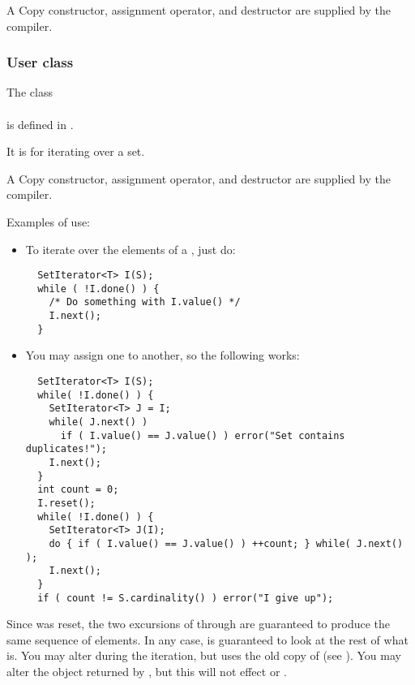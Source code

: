 \noindent A Copy constructor, assignment operator,
and destructor are supplied by the compiler.


\subsubsection{User class }\label{setiterator}


\noindent The class\\
\\
is defined in .

It is for iterating over a set.



\noindent A Copy constructor, assignment operator,
and destructor are supplied by the compiler.

\noindent Examples of use:

\begin{itemize}
\item
To iterate over the elements of a , just do:

\begin{verbatim}
  SetIterator<T> I(S);
  while ( !I.done() ) {
    /* Do something with I.value() */
    I.next();
  }
\end{verbatim}

\item
You may assign one  to another, so the following works:

\begin{verbatim}
  SetIterator<T> I(S);
  while( !I.done() ) {
    SetIterator<T> J = I;
    while( J.next() )
      if ( I.value() == J.value() ) error("Set contains duplicates!");
    I.next();
  }
  int count = 0;
  I.reset();
  while( !I.done() ) {
    SetIterator<T> J(I);
    do { if ( I.value() == J.value() ) ++count; } while( J.next() );
    I.next();
  }
  if ( count != S.cardinality() ) error("I give up");
\end{verbatim}

\end{itemize}

Since  was reset, the two excursions of  through 
are guaranteed to produce the same sequence of elements. In any case, 
is guaranteed to look at the rest of what  is.
You may alter  during the iteration, but  uses the old copy
of  (see ). You may alter the object
returned by , but this will not effect  or .


